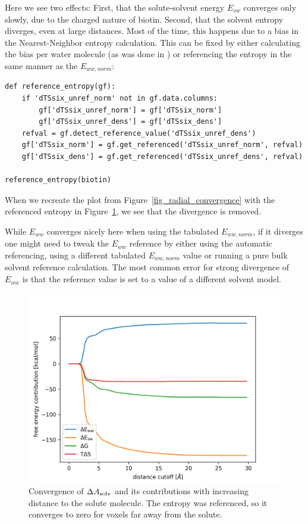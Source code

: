 \documentclass[9pt,tutorial]{livecoms}
\newcommand{\dasolv}{\Delta A_\textup{solv}}
\begin{document}
Here we see two effects: First, that the solute-solvent energy $E_{sw}$ converges only slowly, due to the charged nature of biotin.
Second, that the solvent entropy diverges, even at large distances.
Most of the time, this happens due to a bias in the Nearest-Neighbor entropy calculation\cite{Chen2021,Huggins2014-entropy}.
This can be fixed by either calculating the bias per water molecule (as was done in \cite{Chen2021}) or referencing the entropy in the same manner as the $E_{ww, norm}$:
\begin{lstlisting}[style=python]
	def reference_entropy(gf):
    if 'dTSsix_unref_norm' not in gf.data.columns:
        gf['dTSsix_unref_norm'] = gf['dTSsix_norm']
        gf['dTSsix_unref_dens'] = gf['dTSsix_dens']
    refval = gf.detect_reference_value('dTSsix_unref_dens')
    gf['dTSsix_norm'] = gf.get_referenced('dTSsix_unref_norm', refval)
    gf['dTSsix_dens'] = gf.get_referenced('dTSsix_unref_dens', refval)

reference_entropy(biotin)
\end{lstlisting}
When we recreate the plot from Figure~\ref{fig_radial_convergence} with the referenced entropy in Figure~\ref{fig_radial_convergence_ref}, we see that the divergence is removed.

While $E_{ww}$ converges nicely here when using the tabulated $E_{ww, norm}$, if it diverges one might need to tweak the $E_{ww}$ reference by either using the automatic referencing, using a different tabulated $E_{ww, norm}$ value or running a pure bulk solvent reference calculation.
The most common error for strong divergence of $E_{ww}$ is that the reference value is set to a value of a different solvent model.

\begin{figure}
	\centering
	\includegraphics[width=0.8\linewidth]{figures/biotin-contributions_ref.png}
	\caption{Convergence of $\dasolv$ and its contributions with increasing distance to the solute molecule. The entropy was referenced, so it converges to zero for voxels far away from the solute.}\label{fig_radial_convergence_ref}
\end{figure}
\end{document}
